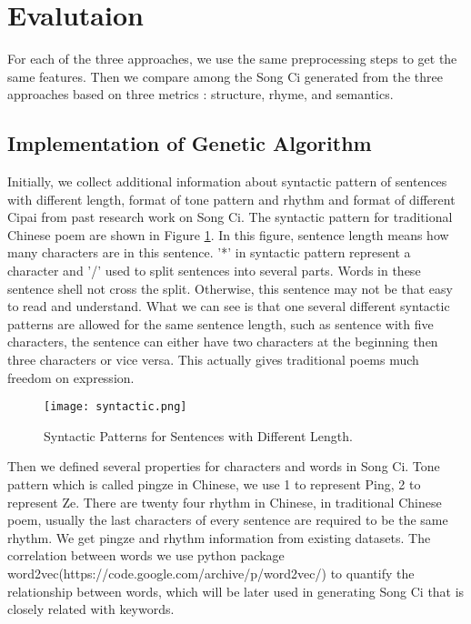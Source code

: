 \section{Evalutaion}
For each of the three approaches, we use the same preprocessing steps to get the same features. Then we compare among the  Song Ci generated from the three approaches based on three metrics : structure, rhyme, and semantics. 

 

\subsection{Implementation of Genetic Algorithm}
Initially, we collect additional information about syntactic pattern of sentences with different length, format of tone pattern and rhythm and format of different Cipai from past research work on Song Ci.
%
The syntactic pattern for traditional Chinese poem are shown in Figure \ref{fig:syntactic}.
%
In this figure, sentence length means how many characters are in this sentence.
%
'*' in syntactic pattern represent a character and '/' used to split sentences into several parts.
%
Words in these sentence shell not cross the split.
%
Otherwise, this sentence may not be that easy to read and understand.
%
What we can see is that one several different syntactic patterns are allowed for the same sentence length, such as sentence with five characters, the sentence can either have two characters at the beginning then three characters or vice versa.
%
This actually gives traditional poems much freedom on expression.

\begin{figure}[htbp]
	\centering
	\texttt{[image: syntactic.png]}
	\caption{Syntactic Patterns for Sentences with Different Length.}
	\label{fig:syntactic}
\end{figure}

Then we defined several properties for characters and words in Song Ci.
%
Tone pattern which is called pingze in Chinese, we use 1 to represent Ping, 2 to represent Ze.
%
There are twenty four rhythm in Chinese, in traditional Chinese poem, usually the last characters of every sentence are required to be the same rhythm.
%
 We get pingze and rhythm information from existing datasets.
%
The correlation between words we use python package word2vec(https://code.google.com/archive/p/word2vec/) to quantify the relationship between words, which will be later used in generating Song Ci that is closely related with keywords.


